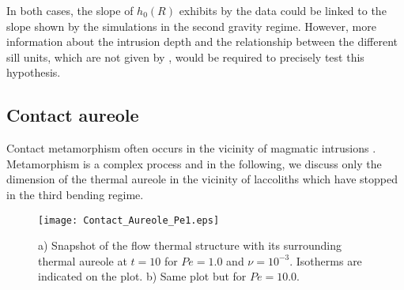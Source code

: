 In both  cases, the slope  of $h_0(R)$ exhibits  by the data  could be
linked to  the slope shown  by the  simulations in the  second gravity
regime. However,  more information about  the intrusion depth  and the
relationship between the different sill  units, which are not given by
\citet{Cruden:tg},   would  be   required  to   precisely  test   this
hypothesis.

\subsection{Contact aureole}
\label{sec:thermal-aureol}

Contact  metamorphism  often  occurs   in  the  vicinity  of  magmatic
intrusions
\citep{Jaeger:1959du,SILLITOE:1998bs,Senger:2014tt}. Metamorphism is a
complex process and in the following, we discuss only the dimension of
the thermal aureole  in the vicinity of laccoliths  which have stopped
in the third bending regime.

\begin{figure}[h!]
  \begin{center}
    \graphicspath{ {/Users/thorey/Documents/These/Projet/Refroidissement/Skin_Model/Figure/Figure_Heating/} }
    \texttt{[image: Contact\_Aureole\_Pe1.eps]}
    \caption{a)  Snapshot  of  the  flow thermal  structure  with  its
      surrounding  thermal   aureole  at   $t=10$  for   $Pe=1.0$  and
      $\nu=10^{-3}$.  Isotherms  are indicated  on the plot.   b) Same
      plot but for $Pe=10.0$.}
    \label{Contact_Areuol2}
  \end{center}
\end{figure}

